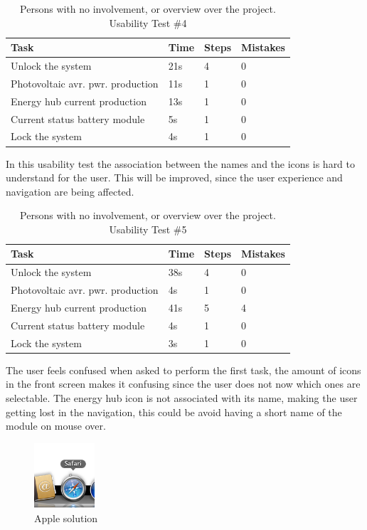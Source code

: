 \begin{table}[H]
\begin{tabular}{ | l | l | l | l |}
	\hline
	Task 					     &		Time 	& 	Steps 	& 	Mistakes 		\\ \hline
	Unlock the system 			     & 		21s		& 	4		& 	0			\\ \hline
	Photovoltaic avr. pwr. production  & 		11s		&	1		& 	0			\\ \hline
	Energy hub current production      & 		13s		& 	1		& 	0			\\ \hline
	Current status battery module 	     & 		5s		& 	1		& 	0			\\ \hline
	Lock the system 			     & 		4s		& 	1		& 	0			\\ \hline
\end{tabular}
\caption{Persons with no involvement, or overview over the project.  Usability Test \#4}
\end{table}
In this usability test the association between the names and the icons is hard to understand for the user. This will be improved, since the user experience and navigation are being affected.\\

\begin{table}[H]
\begin{tabular}{ | l | l | l | l |}
	\hline
	Task 					      & 	Time 	& 	Steps 	& 	Mistakes 		\\ \hline
	Unlock the system 			      & 	38s		& 	4		& 	0			\\ \hline
	Photovoltaic avr. pwr. production   &		4s	    	& 	1		& 	0			\\ \hline
	Energy hub current production 	      & 	41s		& 	5 		& 	4 			\\ \hline
	Current status battery module 	      & 	4s		& 	1		& 	0			\\ \hline
	Lock the system 			      & 	3s		& 	1		& 	0			\\ \hline
\end{tabular}
\caption{Persons with no involvement, or overview over the project. Usability Test \#5}
\end{table}
The user feels confused when asked to perform the first task, the amount of icons in the front screen makes it confusing since the user does not now which ones are selectable. The energy hub icon is not associated with its name, making the user getting lost in the navigation, this could be avoid having a short name of the module on mouse over.

\begin{figure}[H]
	\center
		\includegraphics[width=0.2\textwidth]{images/legend.png}
   	\caption{Apple solution}
\end{figure}

